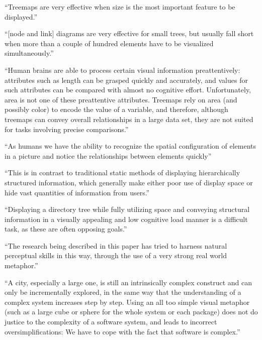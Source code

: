 \enquote{Treemaps are very effective when size is the most important feature to be displayed.}\cite[2]{bruls2000squarified}


\enquote{[node and link] diagrams are very effective for small trees, but usually fall short when more than a couple of hundred elements have to be visualized simultaneously.}\cite[2]{bruls2000squarified}

\enquote{Human brains are able to process certain visual information preattentively: attributes such as length can be grasped quickly and accurately, and values for such attributes can be compared with almost no cognitive effort. Unfortunately, area is not one of these preattentive attributes. Treemaps rely on area (and possibly color) to encode the value of a variable, and therefore, although treemaps can convey overall relationships in a large data set, they are not suited for tasks involving precise comparisons.}\cite{laubheimer_2019}

\enquote{As humans we have the ability to recognize the spatial configuration of
elements in a picture and notice the relationships between elements quickly}\cite[2]{johnson1998tree}

\enquote{This is in contrast to traditional static methods of displaying
hierarchically structured information, which generally make either poor use of
display space or hide vast quantities of information from users.}\cite[2]{johnson1998tree}

\enquote{Displaying a directory tree while fully utilizing space and conveying structural information in a visually appealing and low cognitive load manner is a difficult task, as these are often opposing goals.}\cite[8]{johnson1998tree}

\enquote{The research being described in this paper has tried to harness natural perceptual skills in this way, through the use of a very strong real world metaphor.}\cite[2]{virtualButVisibleMunro}

\enquote{A city, especially a large one, is still an intrinsically complex construct and can only be incrementally explored, in the same way that the understanding of a complex system increases step by step. Using an all too simple visual metaphor (such as a large cube or sphere for the whole system or each package) does not do justice to the complexity of a software system, and leads to incorrect oversimplifications: We have to cope with the fact that software is complex.}\cite[2]{codeCity1}